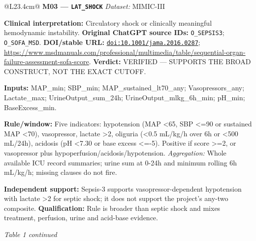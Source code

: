 \begin{tabular}{@{}L{23.4cm}@{}}
\textbf{M03 --- \nolinkurl{LAT_SHOCK}} \hfill \textit{Dataset:} MIMIC-III\par\textbf{Clinical interpretation:} Circulatory shock or clinically meaningful hemodynamic instability. \textbf{Original ChatGPT source IDs:} \nolinkurl{O_SEPSIS3}; \allowbreak \nolinkurl{O_SOFA_MSD}. \textbf{DOI/stable URL:} \href{https://doi.org/10.1001/jama.2016.0287}{\nolinkurl{doi:10.1001/jama.2016.0287}}; \allowbreak \url{https://www.msdmanuals.com/professional/multimedia/table/sequential-organ-failure-assessment-sofa-score}. \textbf{Verdict:} VERIFIED --- SUPPORTS THE BROAD CONSTRUCT, NOT THE EXACT CUTOFF.\par\textbf{Inputs:} MAP\_min; SBP\_min; MAP\_sustained\_lt70\_any; Vasopressors\_any; Lactate\_max; UrineOutput\_sum\_24h; UrineOutput\_mlkg\_6h\_min; pH\_min; BaseExcess\_min.\par\textbf{Rule/window:} Five indicators: hypotension (MAP <65, SBP <=90 or sustained MAP <70), vasopressor, lactate >2, oliguria (<0.5 mL/kg/h over 6h or <500 mL/24h), acidosis (pH <7.30 or base excess <=-5). Positive if score >=2, or vasopressor plus hypoperfusion/acidosis/hypotension. \textit{Aggregation:} Whole available ICU record summaries; urine sum at 0-24h and minimum rolling 6h mL/kg/h; missing clauses do not fire.\par\textbf{Independent support:} Sepsis-3 supports vasopressor-dependent hypotension with lactate >2 for septic shock; it does not support the project's any-two composite. \textbf{Qualification:} Rule is broader than septic shock and mixes treatment, perfusion, urine and acid-base evidence. \\
\addlinespace[3pt]
\midrule
\bottomrule
\end{tabular}
\clearpage
\textit{Table 1 continued}\par
